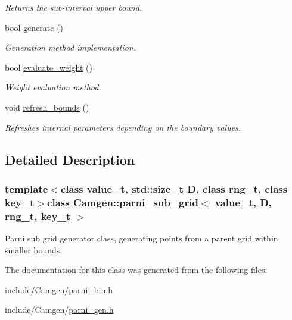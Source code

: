 \begin{DoxyCompactItemize}
\begin{DoxyCompactList}\small\item\em Returns the sub-\/interval upper bound. \end{DoxyCompactList}\item 
\hypertarget{a00397_a5423309febf75bf091f5eb42685eca3f}{}bool \hyperlink{a00397_a5423309febf75bf091f5eb42685eca3f}{generate} ()\label{a00397_a5423309febf75bf091f5eb42685eca3f}

\begin{DoxyCompactList}\small\item\em Generation method implementation. \end{DoxyCompactList}\item 
\hypertarget{a00397_a8b2c09df7a3556afcf6acb728bdfefbc}{}bool \hyperlink{a00397_a8b2c09df7a3556afcf6acb728bdfefbc}{evaluate\+\_\+weight} ()\label{a00397_a8b2c09df7a3556afcf6acb728bdfefbc}

\begin{DoxyCompactList}\small\item\em Weight evaluation method. \end{DoxyCompactList}\item 
\hypertarget{a00397_a47ba1b2a50eed38d949bdc49a41cf9a5}{}void \hyperlink{a00397_a47ba1b2a50eed38d949bdc49a41cf9a5}{refresh\+\_\+bounds} ()\label{a00397_a47ba1b2a50eed38d949bdc49a41cf9a5}

\begin{DoxyCompactList}\small\item\em Refreshes internal parameters depending on the boundary values. \end{DoxyCompactList}\end{DoxyCompactItemize}


\subsection{Detailed Description}
\subsubsection*{template$<$class value\+\_\+t, std\+::size\+\_\+t D, class rng\+\_\+t, class key\+\_\+t$>$class Camgen\+::parni\+\_\+sub\+\_\+grid$<$ value\+\_\+t, D, rng\+\_\+t, key\+\_\+t $>$}

Parni sub grid generator class, generating points from a parent grid within smaller bounds. 

The documentation for this class was generated from the following files\+:\begin{DoxyCompactItemize}
\item 
include/\+Camgen/parni\+\_\+bin.\+h\item 
include/\+Camgen/\hyperlink{a00707}{parni\+\_\+gen.\+h}\end{DoxyCompactItemize}
